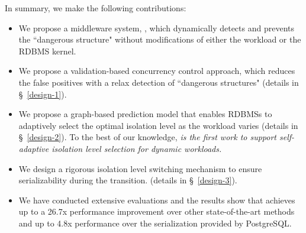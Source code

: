 In summary, we make the following contributions:
\begin{itemize}[leftmargin=*]
    \item We propose a middleware system, \sysname, which dynamically detects and prevents the ``dangerous structure" without modifications of either the workload or the RDBMS kernel.  
    \item We propose a validation-based concurrency control approach, which reduces the false positives with a relax detection of ``dangerous structures"
    (details in \S~\ref{design-1}). 
    \item We propose a graph-based prediction model that enables RDBMSs to adaptively select the optimal isolation level as the workload varies (details in \S~\ref{design-2}). To the best of our knowledge, \textit{\sysname is the first work to support self-adaptive isolation level selection for dynamic workloads.}
    \item We design a rigorous isolation level switching mechanism to ensure serializability during the transition. (details in \S~\ref{design-3}). 
    \item We have conducted extensive evaluations
    and the results show that \sysname achieves up to a 26.7x performance improvement over other state-of-the-art methods and up to 4.8x performance over the serialization provided by PostgreSQL.
\end{itemize}


